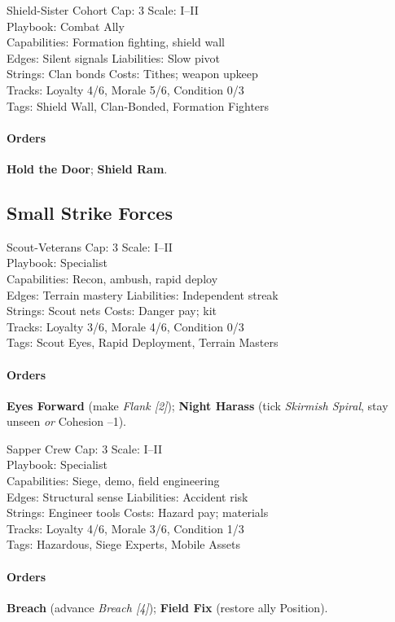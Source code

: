\documentclass[11pt]{article}
\begin{document}
\begin{followerbox}{Shield-Sister Cohort}
Cap: 3 \quad Scale: I--II \\
Playbook: Combat Ally \\
Capabilities: Formation fighting, shield wall \\
Edges: Silent signals \quad Liabilities: Slow pivot \\
Strings: Clan bonds \quad Costs: Tithes; weapon upkeep \\
Tracks: Loyalty 4/6, Morale 5/6, Condition 0/3 \\
Tags: Shield Wall, Clan-Bonded, Formation Fighters
\paragraph{Orders}
\textbf{Hold the Door}; \textbf{Shield Ram}.
\end{followerbox}

\subsection{Small Strike Forces}

\begin{followerbox}{Scout-Veterans}
Cap: 3 \quad Scale: I--II \\
Playbook: Specialist \\
Capabilities: Recon, ambush, rapid deploy \\
Edges: Terrain mastery \quad Liabilities: Independent streak \\
Strings: Scout nets \quad Costs: Danger pay; kit \\
Tracks: Loyalty 3/6, Morale 4/6, Condition 0/3 \\
Tags: Scout Eyes, Rapid Deployment, Terrain Masters
\paragraph{Orders}
\textbf{Eyes Forward} (make \emph{Flank [2]}); \textbf{Night Harass} (tick \emph{Skirmish Spiral}, stay unseen \emph{or} Cohesion --1).
\end{followerbox}

\begin{followerbox}{Sapper Crew}
Cap: 3 \quad Scale: I--II \\
Playbook: Specialist \\
Capabilities: Siege, demo, field engineering \\
Edges: Structural sense \quad Liabilities: Accident risk \\
Strings: Engineer tools \quad Costs: Hazard pay; materials \\
Tracks: Loyalty 4/6, Morale 3/6, Condition 1/3 \\
Tags: Hazardous, Siege Experts, Mobile Assets
\paragraph{Orders}
\textbf{Breach} (advance \emph{Breach [4]}); \textbf{Field Fix} (restore ally Position).
\end{followerbox}
\end{document}

